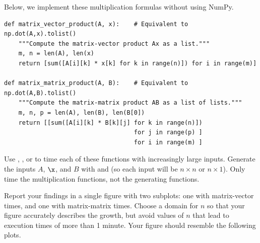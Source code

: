 \begin{problem}
Below, we implement these multiplication formulas without using NumPy.

\begin{lstlisting}
def matrix_vector_product(A, x):    # Equivalent to np.dot(A,x).tolist()
    """Compute the matrix-vector product Ax as a list."""
    m, n = len(A), len(x)
    return [sum([A[i][k] * x[k] for k in range(n)]) for i in range(m)]

def matrix_matrix_product(A, B):    # Equivalent to np.dot(A,B).tolist()
    """Compute the matrix-matrix product AB as a list of lists."""
    m, n, p = len(A), len(B), len(B[0])
    return [[sum([A[i][k] * B[k][j] for k in range(n)])
                                    for j in range(p) ]
                                    for i in range(m) ]
\end{lstlisting}

Use , , or  to time each of these functions with increasingly large inputs.
Generate the inputs $A$, $\x$, and $B$ with  and  (so each input will be $n \times n$ or $n \times 1$).
Only time the multiplication functions, not the generating functions.

Report your findings in a single figure with two subplots: one with matrix-vector times, and one with matrix-matrix times.
Choose a domain for $n$ so that your figure accurately describes the growth, but avoid values of $n$ that lead to execution times of more than 1 minute.
Your figure should resemble the following plots.


\end{problem}
